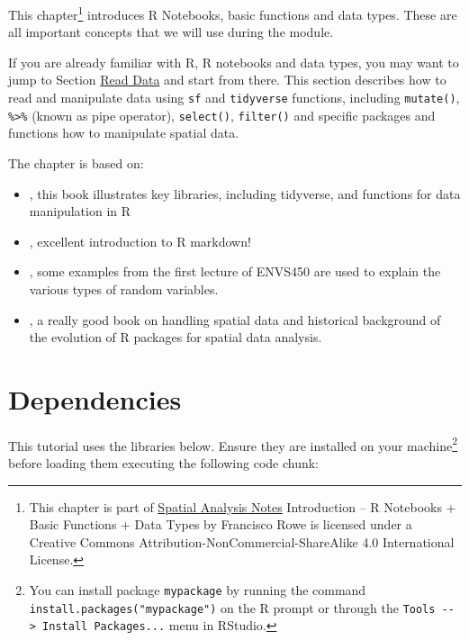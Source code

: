 \documentclass[
]{book}
\begin{document}
This chapter\footnote{This chapter is part of \href{index.html}{Spatial Analysis Notes} {Introduction -- R Notebooks + Basic Functions + Data Types} by Francisco Rowe is licensed under a Creative Commons Attribution-NonCommercial-ShareAlike 4.0 International License.} introduces R Notebooks, basic functions and data types. These are all important concepts that we will use during the module.

If you are already familiar with R, R notebooks and data types, you may want to jump to Section \protect\hyperlink{sec_readdata}{Read Data} and start from there. This section describes how to read and manipulate data using \texttt{sf} and \texttt{tidyverse} functions, including \texttt{mutate()}, \texttt{\%\textgreater{}\%} (known as pipe operator), \texttt{select()}, \texttt{filter()} and specific packages and functions how to manipulate spatial data.

The chapter is based on:

\begin{itemize}
\item
  \citet{grolemund_wickham_2019_book}, this book illustrates key libraries, including tidyverse, and functions for data manipulation in R
\item
  \citet{Xie_et_al_2019_book}, excellent introduction to R markdown!
\item
  \citet{envs450_2018}, some examples from the first lecture of ENVS450 are used to explain the various types of random variables.
\item
  \citet{Lovelace_et_al_2020_book}, a really good book on handling spatial data and historical background of the evolution of R packages for spatial data analysis.
\end{itemize}

\hypertarget{dependencies}{%
\section{Dependencies}\label{dependencies}}

This tutorial uses the libraries below. Ensure they are installed on your machine\footnote{You can install package \texttt{mypackage} by running the command \texttt{install.packages("mypackage")} on the R prompt or through the \texttt{Tools\ -\/-\textgreater{}\ Install\ Packages...} menu in RStudio.} before loading them executing the following code chunk:
\end{document}
